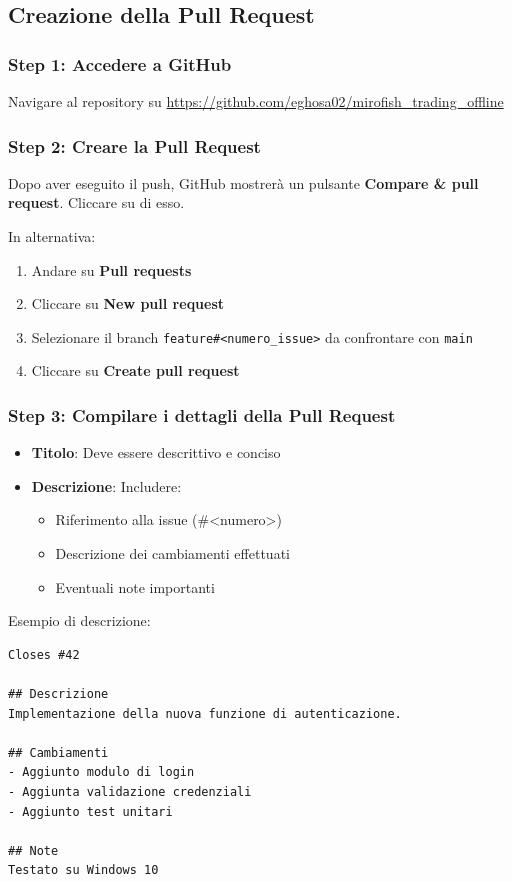 \subsection{Creazione della Pull Request}

\subsubsection{Step 1: Accedere a GitHub}
Navigare al repository su \url{https://github.com/eghosa02/mirofish_trading_offline}

\subsubsection{Step 2: Creare la Pull Request}
Dopo aver eseguito il push, GitHub mostrerà un pulsante \textbf{Compare \& pull request}. Cliccare su di esso.

In alternativa:
\begin{enumerate}
  \item Andare su \textbf{Pull requests}
  \item Cliccare su \textbf{New pull request}
  \item Selezionare il branch \texttt{feature\#<numero\_issue>} da confrontare con \texttt{main}
  \item Cliccare su \textbf{Create pull request}
\end{enumerate}

\subsubsection{Step 3: Compilare i dettagli della Pull Request}
\begin{itemize}
  \item \textbf{Titolo}: Deve essere descrittivo e conciso
  \item \textbf{Descrizione}: Includere:
  \begin{itemize}
    \item Riferimento alla issue (\#<numero>)
    \item Descrizione dei cambiamenti effettuati
    \item Eventuali note importanti
  \end{itemize}
\end{itemize}

Esempio di descrizione:
\begin{verbatim}
Closes #42

## Descrizione
Implementazione della nuova funzione di autenticazione.

## Cambiamenti
- Aggiunto modulo di login
- Aggiunta validazione credenziali
- Aggiunto test unitari

## Note
Testato su Windows 10
\end{verbatim}

